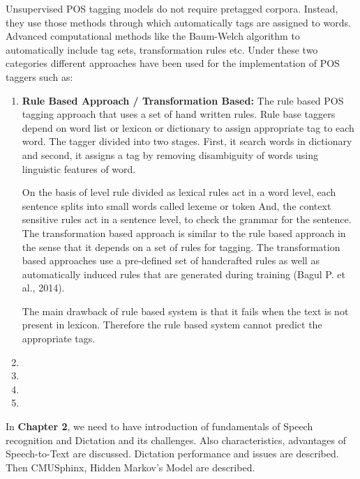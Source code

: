 \documentclass[12pt,a4paper,oneside]{memoir}
\begin{document}
Unsupervised POS tagging models do not require pretagged corpora. Instead, they use those methods through which automatically tags are assigned to words. Advanced computational methods like the Baum-Welch algorithm to automatically include tag sets, transformation rules etc. Under these two categories different approaches have been used for the implementation of POS taggers such as: 

\begin{enumerate}
  \item \textbf{Rule Based Approach / Transformation Based:} The rule based POS tagging approach that uses a set of hand written rules. Rule base taggers depend on word list or lexicon or dictionary to assign appropriate tag to each word. The tagger divided into two stages. First, it search words in dictionary and second, it assigns a tag by removing disambiguity of words using linguistic features of word.	

On the basis of level rule divided as lexical rules act in a word level, each sentence splits into small words called lexeme or token And, the context sensitive rules act in a sentence level, to check the grammar for the sentence. The transformation based approach is similar to the rule based approach in the sense that it depends on a set of rules for tagging. The transformation based approaches use a pre-defined set of handcrafted rules as well as automatically induced rules that are generated during training (Bagul P. et al., 2014). 

The main drawback of rule based system is that it fails when the text is not present in lexicon. Therefore the rule based system cannot predict the appropriate tags. 

  \item
  \item
  \item
  \item
\end{enumerate}













In \textbf{Chapter 2}, we need to have introduction of fundamentals of Speech recognition and Dictation and its challenges. Also characteristics, advantages of Speech-to-Text are discussed. Dictation performance and issues are described. Then CMUSphinx, Hidden Markov's Model are described.\\
\end{document}
